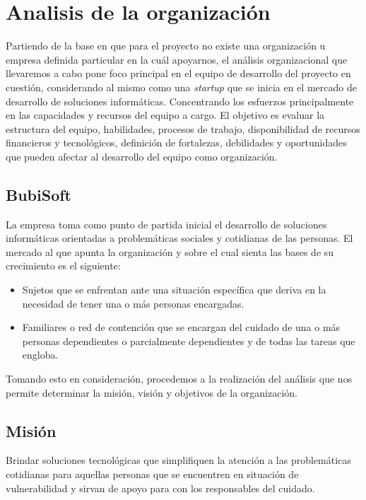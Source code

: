 \documentclass[a4paper,12pt]{article}
\begin{document}
    \newpage

    \tableofcontents 
    
    \newpage

    \section{Analisis de la organización}
    Partiendo de la base en que para el proyecto no existe una organización u empresa definida particular en la cuál apoyarnos, el análisis organizacional que llevaremos a cabo pone foco principal en el equipo de desarrollo del proyecto en cuestión, considerando al mismo como una \textit{startup} que se inicia en el mercado de desarrollo de soluciones informáticas. Concentrando los esfuerzos principalmente en las capacidades y recursos del equipo a cargo.\newline
    El objetivo es evaluar la estructura del equipo, habilidades, procesos de trabajo, disponibilidad de recursos financieros y tecnológicos, definición de fortalezas, debilidades y oportunidades que pueden afectar al desarrollo del equipo como organización.
    \subsection{BubiSoft}
    La empresa toma como punto de partida inicial el desarrollo de soluciones informáticas orientadas a problemáticas sociales y cotidianas de las personas.\newline
    El mercado al que apunta la organización y sobre el cual sienta las bases de su crecimiento es el siguiente:
    \begin{itemize}
        \item Sujetos que se enfrentan ante una situación específica que deriva en la necesidad de tener una o más personas encargadas.
        \item Familiares o red de contención que se encargan del cuidado de una o más personas dependientes o parcialmente dependientes y de todas las tareas que engloba.
    \end{itemize}
    Tomando esto en consideración, procedemos a la realización del análisis que nos permite determinar la misión, visión y objetivos de la organización.
    \subsection{Misión}
    Brindar soluciones tecnológicas que simplifiquen la atención a las problemáticas cotidianas para aquellas personas que se encuentren en situación de vulnerabilidad y sirvan de apoyo para con los responsables del cuidado.
\end{document}
